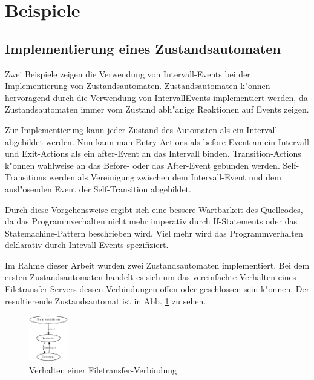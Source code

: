 \section{Beispiele}
\subsection{Implementierung eines Zustandsautomaten}
Zwei Beispiele zeigen die Verwendung von Intervall-Events bei der
Implementierung von Zustandsautomaten. Zustandsautomaten k"onnen hervoragend
durch die Verwendung von IntervallEvents implementiert werden, da
Zustandsautomaten immer vom Zustand abh"anige Reaktionen auf Events zeigen.

Zur Implementierung kann jeder Zustand des Automaten als ein Intervall
abgebildet werden. Nun kann man Entry-Actions als before-Event an ein Intervall
und Exit-Actions als ein after-Event an das Intervall binden. Transition-Actions
k"onnen wahlweise an das Before- oder das After-Event gebunden werden.
Self-Transitions werden als Vereinigung zwischen dem Intervall-Event und dem
ausl"osenden Event der Self-Transition abgebildet. 

Durch diese Vorgehensweise ergibt sich eine bessere Wartbarkeit des
Quellcodes, da das Programmverhalten nicht mehr imperativ durch If-Statements
oder das Statemachine-Pattern beschrieben wird. Viel mehr wird das
Programmverhalten deklarativ durch Intevall-Events spezifiziert.

Im Rahme dieser Arbeit wurden zwei Zustandsautomaten implementiert. Bei dem
ersten Zustandsautomaten handelt es sich um das vereinfachte Verhalten eines
Filetransfer-Servers dessen Verbindungen offen oder geschlossen sein k"onnen. Der
resultierende Zustandsautomat ist in Abb. \ref{filetransfer_behaviour} zu sehen.

\begin{figure}[htp]
\begin{center}
  \includegraphics[width=0.15\textwidth]{graphics/tcp_stm.dot.eps}
  \caption{Verhalten einer Filetransfer-Verbindung}
  \label{filetransfer_behaviour}
\end{center}
\end{figure}

